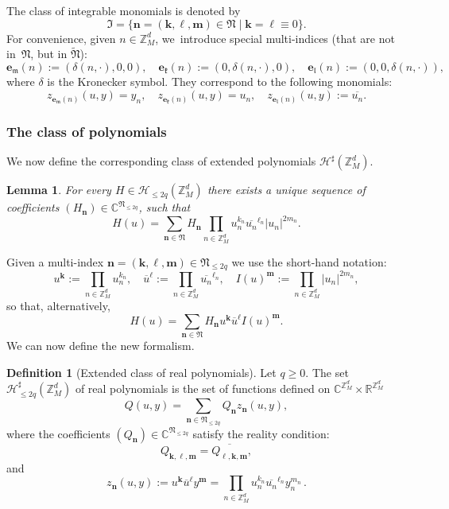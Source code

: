 \documentclass[10pt,a4paper]{amsart}
\theoremstyle{plain}
\newtheorem{lemma}[theorem]{Lemma}
\theoremstyle{definition}
\newtheorem{definition}[theorem]{Definition}
\newcommand{\nb}{{\boldsymbol n}}
\newcommand{\kb}{{\boldsymbol k}}
\newcommand{\lb}{{\boldsymbol \ell}}
\newcommand{\mb}{{\boldsymbol m}}
\newcommand{\Nb}{{\boldsymbol{\mathfrak{N}}}}
\newcommand{\Z}{\mathbb{Z}}
\newcommand{\R}{\mathbb{R}}
\newcommand{\C}{\mathbb{C}}
\newcommand{\1}{\mathbf{1}}
\begin{document}
The class of integrable monomials is denoted by
\begin{equation}
\label{eq:I}
\mathfrak{I} = \{\nb=(\kb,\lb,\mb)\in\Nb\mid \kb=\lb\equiv0\}.
\end{equation}
For convenience, given $n\in\Z_{M}^{d}$, we~introduce special multi-indices (that are not in~$\Nb$, but in $\widetilde{\Nb}$):
\[
\boldsymbol{e}_{\mathfrak{m}}(n) := (\delta(n,\cdot),0,0),\quad \boldsymbol{e}_{\mathfrak{k}}(n):=(0,\delta(n, \cdot),0),\quad \boldsymbol{e}_{\mathfrak{l}}(n) := (0,0,\delta(n,\cdot)),
\]
where $\delta$ is the Kronecker symbol. They correspond to the following monomials:
\[
z_{\boldsymbol{e}_{\mathfrak{m}}(n)}(u,y) = y_{n},
\quad z_{\boldsymbol{e}_{\mathfrak{k}}(n)}(u,y) = u_{n},
\quad z_{\boldsymbol{e}_{\mathfrak{l}}(n)}(u,y) := \overline{u_{n}}.
\]

\subsubsection{The class of polynomials} We now define the corresponding class of extended polynomials $\mathcal{H}^{\sharp}(\Z_{M}^{d})$.

\begin{lemma} \label{lem:pouette}
For every $H\in\mathcal{H}_{\leq 2q}(\Z_{M}^{d})$ there exists a unique sequence of coefficients $(H_{\nb})\in\C^{\Nb_{\leq2q}}$, such that
\[
H(u) = \sum_{\nb\in\Nb} H_{\nb}
\prod_{n\in\Z_{M}^{d}}
u_{n}^{k_{n}}\overline{u_{n}}^{\ell_{n}}|u_{n}|^{2m_{n}}.
\]
\end{lemma}
Given a multi-index $\nb=(\kb,\lb,\mb)\in\Nb_{\leq2q}$ we use the short-hand notation:
\[
u^{\kb}
:= \prod_{n\in\Z_{M}^{d}}u_{n}^{k_{n}},
\quad
\overline{u}^{\lb}
:= \prod_{n\in\Z_{M}^{d}}\overline{u_{n}}^{\ell_{n}},\quad
I(u)^{\mb}
:= \prod_{n\in\Z_{M}^{d}}|u_{n}|^{2m_{n}},
\]
so that, alternatively,
\[
H(u) = \sum_{\nb\in\Nb} H_{\nb}u^{\kb}\overline{u}^{\lb}I(u)^{\mb}.
\]
We can now define the new formalism.
\begin{definition}[Extended class of real polynomials]
\label{def:ext} Let $q\geq0$. The set $\mathcal{H}^{\sharp}_{\leq2q}(\Z_{M}^{d})$ of real polynomials is the set of functions defined on $\C^{\Z_{M}^{d}}\times\R^{\Z_{M}^{d}}$
\[
Q(u,y) = \sum_{\nb\in\Nb_{\leq2q}} Q_{\nb}z_{\nb}(u,y),
\]
where the coefficients $(Q_{\nb})\in\C^{\Nb_{\leq2q}}$ satisfy the reality condition:
\[
Q_{\kb,\lb,\mb}= \overline{Q_{\lb,\kb,\mb}},
\]
and
\[
z_{\nb}(u,y) := u^{\kb}\overline{u}^{\lb}y^{\mb} = \prod_{n\in\Z_{M}^{d}}u_n^{k_n}\overline{u_{n}}^{\ell_n}y_n^{m_n}\,.
\]
\end{definition}
\end{document}
